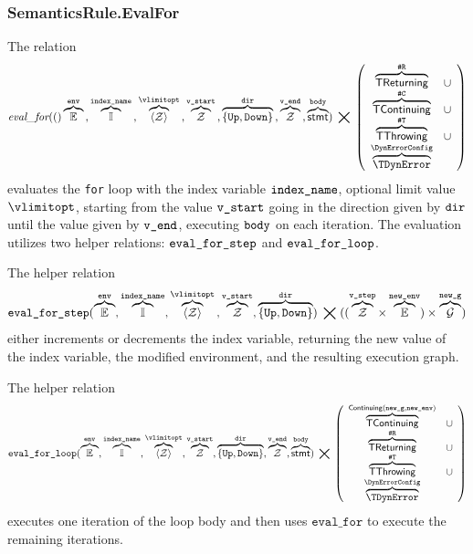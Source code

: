 \subsubsection{SemanticsRule.EvalFor\label{sec:SemanticsRule.EvalFor}}
The relation
\hypertarget{def-evalfor}{}
\[
  \evalfor(
    \overname{\envs}{\env} \aslsep
    \overname{\Identifiers}{\vindexname} \aslsep
    \overname{\langle\tint\rangle}{\vlimitopt} \aslsep
    \overname{\tint}{\vstart} \aslsep
    \overname{\{\UP, \DOWN\}}{\dir} \aslsep
    \overname{\tint}{\vend} \aslsep
    \overname{\stmt}{\vbody})
  \;\aslrel\;
  \left(
    \begin{array}{cl}
    \overname{\TReturning}{\ReturningConfig} & \cup\\
    \overname{\TContinuing}{\ContinuingConfig} & \cup\\
    \overname{\TThrowing}{\ThrowingConfig} & \cup\\
    \overname{\TDynError}{\DynErrorConfig} &
    \end{array}
    \right)
\]
evaluates the \texttt{for} loop with the index variable $\texttt{index\_name}$,
optional limit value $\vlimitopt$,
starting from the value
$\texttt{v\_start}$ going in the direction given by $\texttt{dir}$ until the value given by $\texttt{v\_end}$,
executing $\texttt{body}$ on each iteration.
%
The evaluation utilizes two helper relations: $\texttt{eval\_for\_step}$ and $\texttt{eval\_for\_loop}$.

\hypertarget{def-evalforstep}{}
The helper relation
\[
  \evalforstep(
    \overname{\envs}{\env},
    \overname{\Identifiers}{\vindexname},
    \overname{\langle\tint\rangle}{\vlimitopt} \aslsep
    \overname{\tint}{\vstart},
    \overname{\{\UP,\DOWN\}}{\dir})
    \;\aslrel\;
    ((\overname{\tint}{\vstep} \times \overname{\envs}{\newenv}) \times \overname{\XGraphs}{\newg})
\]
either increments or decrements the index variable,
returning the new value of the index variable, the modified environment,
and the resulting execution graph.

\hypertarget{def-evalforloop}{}
The helper relation
\[
  \evalforloop(\overname{
    \envs}{\env},
    \overname{\Identifiers}{\vindexname},
    \overname{\langle\tint\rangle}{\vlimitopt},
    \overname{\tint}{\vstart},
    \overname{\{\UP,\DOWN\}}{\dir},
    \overname{\tint}{\vend},
    \overname{\stmt}{\vbody}) \;\aslrel\;
    \left(
    \begin{array}{cl}
      \overname{\TContinuing}{\Continuing(\newg, \newenv)} & \cup\\
      \overname{\TReturning}{\ReturningConfig} & \cup\\
    \overname{\TThrowing}{\ThrowingConfig} & \cup \\
    \overname{\TDynError}{\DynErrorConfig} &
    \end{array}
    \right)
\]
executes one iteration of the loop body and then uses $\texttt{eval\_for}$ to execute the remaining
iterations.

